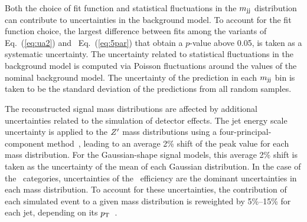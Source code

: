 

Both the choice of fit function and statistical fluctuations in the $m_{\textrm{jj}}$ distribution can contribute to uncertainties in the background model.
To account for the fit function choice, the largest difference between fits among the variants of Eq.~(\ref{eq:ua2}) and~ Eq.~(\ref{eq:5par}) that obtain a $p$-value above 0.05, is taken as a systematic uncertainty.
The uncertainty related to statistical fluctuations in the background model is computed via Poisson fluctuations around the values of the nominal background model.
The uncertainty of the prediction in each $m_{\textrm{jj}}$ bin is taken to be the standard deviation of the predictions from all random samples.

The reconstructed signal mass distributions are affected by additional uncertainties related to the simulation of detector effects.
The jet energy scale uncertainty is applied to the $Z^{\prime}$ mass distributions using a four-principal-component method~\cite{PERF-2016-04,ATL-PHYS-PUB-2015-014,ATL-PHYS-PUB-2015-015}, leading to an average 2\% shift of the peak value for each mass distribution.
For the Gaussian-shape signal models, this average 2\% shift is taken as the uncertainty of the mean of each Gaussian distribution.
In the case of the \btagged\ categories, uncertainties of the \btagging\ efficiency are the dominant uncertainties in each mass distribution.
To account for these uncertainties, the contribution of each simulated event to a given mass distribution is reweighted by 5\%--15\% for each jet, depending on its $p_{\text{T}}$~\cite{PERF-2016-05}.

